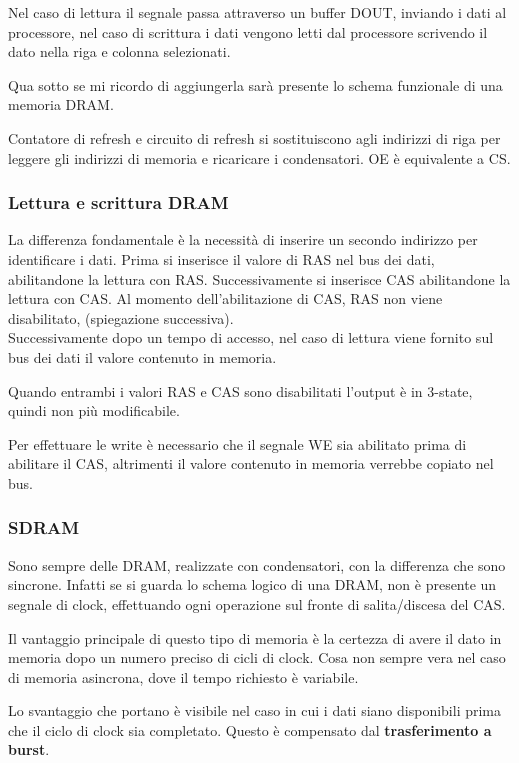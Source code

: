 \documentclass[../template]{subfiles}
\begin{document}
Nel caso di lettura il segnale passa attraverso un buffer DOUT, inviando i dati al processore, nel caso di scrittura i dati vengono letti dal processore scrivendo il dato nella riga e colonna selezionati.

Qua sotto se mi ricordo di aggiungerla sarà presente lo schema funzionale di una memoria DRAM.

Contatore di refresh e circuito di refresh si sostituiscono agli indirizzi di riga per leggere gli indirizzi di memoria e ricaricare i condensatori.
OE è equivalente a CS.

\subsubsection{Lettura e scrittura DRAM}
La differenza fondamentale è la necessità di inserire un secondo indirizzo per identificare i dati.
Prima si inserisce il valore di RAS nel bus dei dati, abilitandone la lettura con RAS. Successivamente si inserisce CAS abilitandone la lettura con CAS. Al momento dell'abilitazione di CAS, RAS non viene disabilitato, (spiegazione successiva).
\\
Successivamente dopo un tempo di accesso, nel caso di lettura viene fornito sul bus dei dati il valore contenuto in memoria.

Quando entrambi i valori RAS e CAS sono disabilitati l'output è in 3-state, quindi non più modificabile.

Per effettuare le write è necessario che il segnale WE sia abilitato prima di abilitare il CAS, altrimenti il valore contenuto in memoria verrebbe copiato nel bus.

\subsubsection{SDRAM}
Sono sempre delle DRAM, realizzate con condensatori, con la differenza che sono sincrone.
Infatti se si guarda lo schema logico di una DRAM, non è presente un segnale di clock, effettuando ogni operazione sul fronte di salita/discesa del CAS.

Il vantaggio principale di questo tipo di memoria è la certezza di avere il dato in memoria dopo un numero preciso di cicli di clock. Cosa non sempre vera nel caso di memoria asincrona, dove il tempo richiesto è variabile.

Lo svantaggio che portano è visibile nel caso in cui i dati siano disponibili prima che il ciclo di clock sia completato.
Questo è compensato dal \textbf{trasferimento a burst}.
\end{document}
